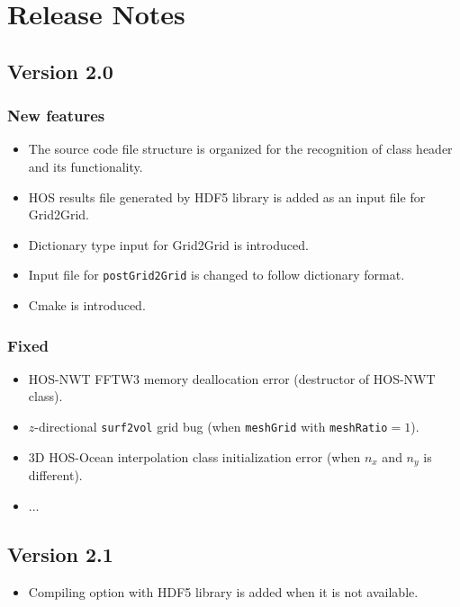 \pagebreak

\pagebreak
\section*{Release Notes}

\subsection*{Version 2.0}

\subsubsection*{New features}
\begin{itemize}	
	\item The source code file structure is organized for the recognition of class header and its functionality. 
	\item HOS results file generated by HDF5 library is added as an input file for Grid2Grid. 
	\item Dictionary type input for Grid2Grid is introduced. 
	\item Input file for \texttt{postGrid2Grid} is changed to follow dictionary format. 
	\item Cmake is introduced. 
\end{itemize}

\subsubsection*{Fixed}
\begin{itemize}	
	\item HOS-NWT FFTW3 memory deallocation error (destructor of HOS-NWT class). 
	\item $z$-directional \texttt{surf2vol} grid bug (when \texttt{meshGrid} with \texttt{meshRatio}$=1$).
	\item 3D HOS-Ocean interpolation class initialization error (when $n_x$ and $n_y$ is different).
	\item ... 
\end{itemize}

\subsection*{Version 2.1}
\begin{itemize}	
	\item Compiling option with HDF5 library is added when it is not available. 
\end{itemize}

\pagebreak

